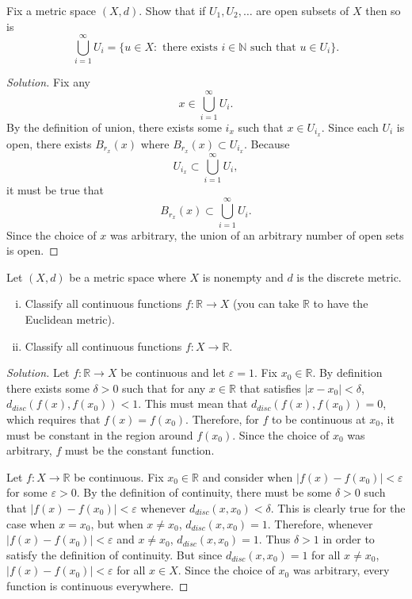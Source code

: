 \documentclass[11pt,letterpaper]{article}
\newcommand{\N}{\mathbb{N}}
\newcommand{\R}{\mathbb{R}}
\newcommand{\eps}{\varepsilon}
\renewcommand{\epsilon}{\eps}
\newenvironment{prob}[1]
  {\renewcommand\theinnerprob{#1}\innerprob}
  {\endinnerprob}
\newenvironment{solution}
  {\renewcommand\qedsymbol{}\begin{proof}[Solution]}
  {\end{proof}\bigskip}
\begin{document}
\begin{prob}{2}  %
Fix a metric space $(X,d)$.  Show that if $U_1, U_2, \dots$ are open subsets of $X$ then so is
\[
	\bigcup_{i=1}^\infty U_i = \{ u \in X : \text{ there exists } i\in\N \text{ such that } u \in U_i\}.
\]
\end{prob}
\begin{solution}
	Fix any $$ x \in \bigcup_{i=1}^\infty U_i.$$ By the definition of union, there exists some $i_x$ such that $x\in U_{i_x}$. Since each $U_i$ is open, there exists $B_{r_x}(x)$ where $B_{r_x}(x) \subset U_{i_x}$. Because $$U_{i_x} \subset \bigcup_{i=1}^\infty U_i,$$ it must be true that $$B_{r_x}(x) \subset \bigcup_{i=1}^\infty U_i.$$ Since the choice of $x$ was arbitrary, the union of an arbitrary number of open sets is open. 
\end{solution}
\newpage




\begin{prob}{3}  %
Let $(X, d)$ be a metric space where $X$ is nonempty and $d$ is the discrete metric.
\begin{enumerate}[(i)]
	
	\item Classify all continuous functions $f: \R \to X$ (you can take $\R$ to have the Euclidean metric).
	
	\item Classify all continuous functions $f: X \to \R$.
	
\end{enumerate}
\end{prob}
\begin{solution}
	Let $f: \R \to X$ be continuous and let $\epsilon = 1$. Fix $x_0 \in \R$. By definition there exists some $\delta > 0$ such that for any $x\in \R$ that satisfies $|x-x_0| < \delta$, $d_{disc}(f(x),f(x_0)) < 1$. This must mean that $d_{disc}(f(x),f(x_0)) = 0$, which requires that $f(x) = f(x_0)$. Therefore, for $f$ to be continuous at $x_0$, it must be constant in the region around $f(x_0)$. Since the choice of $x_0$ was arbitrary, $f$ must be the constant function.
	
	Let $f: X \to \R$ be continuous. Fix $x_0 \in \R$ and consider when $|f(x) - f(x_0)| < \epsilon$ for some $\epsilon > 0$. By the definition of continuity, there must be some $\delta > 0$ such that $|f(x) - f(x_0)| < \epsilon$ whenever $d_{disc}(x,x_0) < \delta$. This is clearly true for the case when $x = x_0$, but when $x\not=x_0$, $d_{disc}(x,x_0) = 1$. Therefore, whenever $|f(x) - f(x_0)| < \epsilon$ and $x \not=x_0$,  $d_{disc}(x,x_0) = 1$. Thus $\delta > 1$ in order to satisfy the definition of continuity. But since $d_{disc}(x,x_0) = 1$ for all $x \not= x_0$, $|f(x) - f(x_0)| < \epsilon$ for all $x \in X$. Since the choice of $x_0$ was arbitrary, every function is continuous everywhere. 
	
\end{solution}
\newpage
\end{document}
